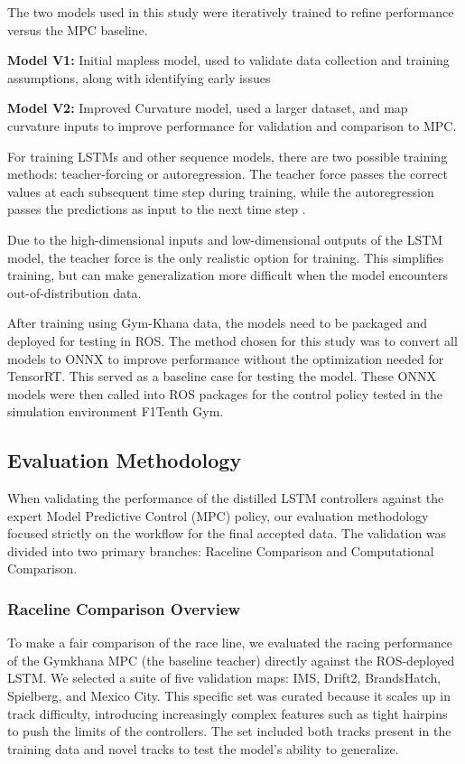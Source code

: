 \documentclass[conference]{IEEEtran}
\begin{document}
The two models used in this study were iteratively trained to refine performance versus the MPC baseline. 

\textbf{Model V1:} Initial mapless model, used to validate data collection and training assumptions, along with identifying early issues

\textbf{Model V2:} Improved Curvature model, used a larger dataset, and map curvature inputs to improve performance for validation and comparison to MPC.

For training LSTMs and other sequence models, there are two possible training methods: teacher-forcing or autoregression. The teacher force passes the correct values at each subsequent time step during training, while the autoregression passes the predictions as input to the next time step \cite{davies2024teacherforcing}.

Due to the high-dimensional inputs and low-dimensional outputs of the LSTM model, the teacher force is the only realistic option for training. This simplifies training, but can make generalization more difficult when the model encounters out-of-distribution data. 

After training using Gym-Khana data, the models need to be packaged and deployed for testing in ROS. The method chosen for this study was to convert all models to ONNX to improve performance without the optimization needed for TensorRT. This served as a baseline case for testing the model. These ONNX models were then called into ROS packages for the control policy tested in the simulation environment F1Tenth Gym. 

\subsection{Evaluation Methodology}
When validating the performance of the distilled LSTM controllers against the expert Model Predictive Control (MPC) policy, our evaluation methodology focused strictly on the workflow for the final accepted data. The validation was divided into two primary branches: Raceline Comparison and Computational Comparison. 

\subsubsection{Raceline Comparison Overview}

To make a fair comparison of the race line, we evaluated the racing performance of the Gymkhana MPC (the baseline teacher) directly against the ROS-deployed LSTM. We selected a suite of five validation maps: IMS, Drift2, BrandsHatch, Spielberg, and Mexico City. This specific set was curated because it scales up in track difficulty, introducing increasingly complex features such as tight hairpins to push the limits of the controllers. The set included both tracks present in the training data and novel tracks to test the model's ability to generalize. 
\end{document}
